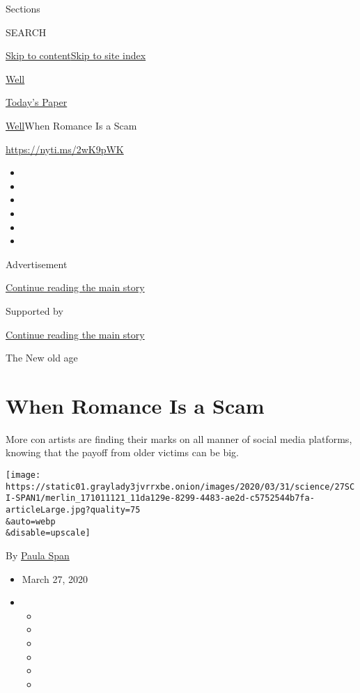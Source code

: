 Sections

SEARCH

\protect\hyperlink{site-content}{Skip to
content}\protect\hyperlink{site-index}{Skip to site index}

\href{https://www.nytimes3xbfgragh.onion/section/well}{Well}

\href{https://myaccount.nytimes3xbfgragh.onion/auth/login?response_type=cookie\&client_id=vi}{}

\href{https://www.nytimes3xbfgragh.onion/section/todayspaper}{Today's
Paper}

\href{/section/well}{Well}\textbar{}When Romance Is a Scam

\url{https://nyti.ms/2wK9pWK}

\begin{itemize}
\item
\item
\item
\item
\item
\item
\end{itemize}

Advertisement

\protect\hyperlink{after-top}{Continue reading the main story}

Supported by

\protect\hyperlink{after-sponsor}{Continue reading the main story}

The New old age

\hypertarget{when-romance-is-a-scam}{%
\section{When Romance Is a Scam}\label{when-romance-is-a-scam}}

More con artists are finding their marks on all manner of social media
platforms, knowing that the payoff from older victims can be big.

\texttt{[image: https://static01.graylady3jvrrxbe.onion/images/2020/03/31/science/27SCI-SPAN1/merlin\_171011121\_11da129e-8299-4483-ae2d-c5752544b7fa-articleLarge.jpg?quality=75\\\&auto=webp\\\&disable=upscale]}

By \href{https://www.nytimes3xbfgragh.onion/by/paula-span}{Paula Span}

\begin{itemize}
\item
  March 27, 2020
\item
  \begin{itemize}
  \item
  \item
  \item
  \item
  \item
  \item
  \end{itemize}
\end{itemize}

